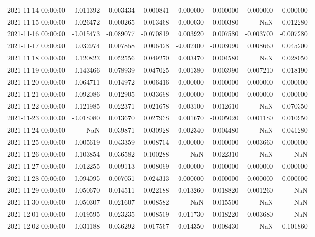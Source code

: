 \begin{tabular}{lrrrrrrr}
2021-11-14 00:00:00 & -0.011392 & -0.003434 & -0.000841 & 0.000000 & 0.000000 & 0.000000 & 0.000000 \\
2021-11-15 00:00:00 & 0.026472 & -0.000265 & -0.013468 & 0.000030 & -0.000380 & NaN & 0.012280 \\
2021-11-16 00:00:00 & -0.015473 & -0.089077 & -0.070819 & 0.003920 & 0.007580 & -0.003700 & -0.007280 \\
2021-11-17 00:00:00 & 0.032974 & 0.007858 & 0.006428 & -0.002400 & -0.003090 & 0.008660 & 0.045200 \\
2021-11-18 00:00:00 & 0.120823 & -0.052556 & -0.049270 & 0.003470 & 0.004580 & NaN & 0.028050 \\
2021-11-19 00:00:00 & 0.143466 & 0.078939 & 0.047025 & -0.001380 & 0.003990 & 0.007210 & 0.018190 \\
2021-11-20 00:00:00 & -0.064711 & -0.014972 & 0.006416 & 0.000000 & 0.000000 & 0.000000 & 0.000000 \\
2021-11-21 00:00:00 & -0.092086 & -0.012905 & -0.033698 & 0.000000 & 0.000000 & 0.000000 & 0.000000 \\
2021-11-22 00:00:00 & 0.121985 & -0.022371 & -0.021678 & -0.003100 & -0.012610 & NaN & 0.070350 \\
2021-11-23 00:00:00 & -0.018080 & 0.013670 & 0.027938 & 0.001670 & -0.005020 & 0.001180 & 0.010950 \\
2021-11-24 00:00:00 & NaN & -0.039871 & -0.030928 & 0.002340 & 0.004480 & NaN & -0.041280 \\
2021-11-25 00:00:00 & 0.005619 & 0.043359 & 0.008704 & 0.000000 & 0.000000 & 0.003660 & 0.000000 \\
2021-11-26 00:00:00 & -0.103854 & -0.036582 & -0.100288 & NaN & -0.022310 & NaN & NaN \\
2021-11-27 00:00:00 & 0.012255 & -0.009113 & 0.008099 & 0.000000 & 0.000000 & 0.000000 & 0.000000 \\
2021-11-28 00:00:00 & 0.094095 & -0.007051 & 0.024313 & 0.000000 & 0.000000 & 0.000000 & 0.000000 \\
2021-11-29 00:00:00 & -0.050670 & 0.014511 & 0.022188 & 0.013260 & 0.018820 & -0.001260 & NaN \\
2021-11-30 00:00:00 & -0.050307 & 0.021607 & 0.008582 & NaN & -0.015500 & NaN & NaN \\
2021-12-01 00:00:00 & -0.019595 & -0.023235 & -0.008509 & -0.011730 & -0.018220 & -0.003680 & NaN \\
2021-12-02 00:00:00 & -0.031188 & 0.036292 & -0.017567 & 0.014350 & 0.008430 & NaN & -0.101860 \\

\end{tabular}
